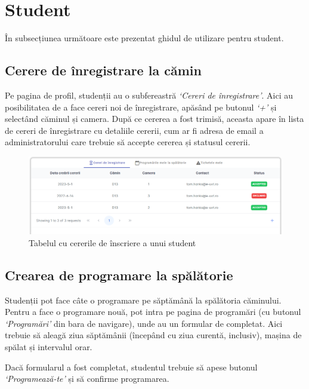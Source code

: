 \documentclass[12pt,a4paper]{report}
\theoremstyle{definition}
\theoremstyle{remark}
\begin{document}
\section{Student}
În subsecțiunea următoare este prezentat ghidul de utilizare pentru student. 

\subsection{Cerere de înregistrare la cămin}

\par Pe pagina de profil, studenții au o subfereastră \textit{`Cereri de înregistrare'}. Aici au posibilitatea de a face cereri noi de înregistrare, apăsând pe butonul \textit{`+'} și selectând căminul și camera. După ce cererea a fost trimisă, aceasta  apare în lista de cereri de înregistrare cu detaliile cererii, cum ar fi adresa de email a administratorului care trebuie să accepte cererea și statusul cererii.

\begin{figure}[H]
    \centering
    \includegraphics[width=0.7\linewidth]{resurse/ghid_utilizare/register_request_student.png}
    \caption{Tabelul cu cererile de înscriere a unui student}
\end{figure}

\subsection{Crearea de programare la spălătorie}

\par Studenții pot face câte o programare pe săptămână la spălătoria căminului. Pentru a face o programare nouă, pot intra pe pagina de programări (cu butonul \textit{`Programări'} din bara de navigare), unde au un formular de completat. Aici trebuie să aleagă ziua săptămânii (începând cu ziua curentă, inclusiv), mașina de spălat și intervalul orar.

\par Dacă formularul a fost completat, studentul trebuie să apese butonul \textit{`Programează-te'} și să confirme programarea.
\end{document}

